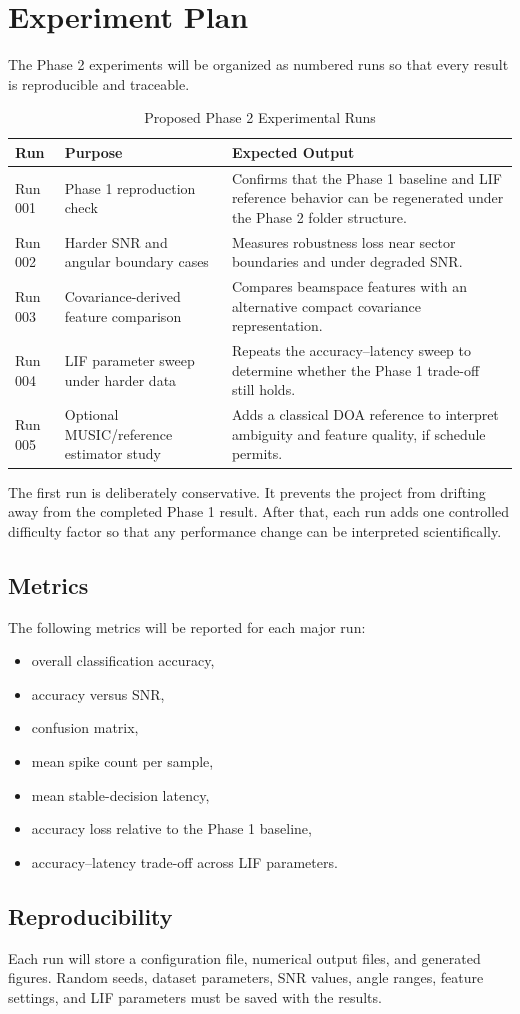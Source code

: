 \section{Experiment Plan}

The Phase 2 experiments will be organized as numbered runs so that every result is reproducible and traceable.

\begin{table}[H]
\centering
\caption{Proposed Phase 2 Experimental Runs}
\begin{tabular}{p{}p{}p{}}
\toprule
\textbf{Run} & \textbf{Purpose} & \textbf{Expected Output} \\
\midrule
Run 001 & Phase 1 reproduction check & Confirms that the Phase 1 baseline and LIF reference behavior can be regenerated under the Phase 2 folder structure. \\
Run 002 & Harder SNR and angular boundary cases & Measures robustness loss near sector boundaries and under degraded SNR. \\
Run 003 & Covariance-derived feature comparison & Compares beamspace features with an alternative compact covariance representation. \\
Run 004 & LIF parameter sweep under harder data & Repeats the accuracy--latency sweep to determine whether the Phase 1 trade-off still holds. \\
Run 005 & Optional MUSIC/reference estimator study & Adds a classical DOA reference to interpret ambiguity and feature quality, if schedule permits. \\
\bottomrule
\end{tabular}
\end{table}

The first run is deliberately conservative. It prevents the project from drifting away from the completed Phase 1 result. After that, each run adds one controlled difficulty factor so that any performance change can be interpreted scientifically.

\subsection{Metrics}

The following metrics will be reported for each major run:

\begin{itemize}
    \item overall classification accuracy,
    \item accuracy versus SNR,
    \item confusion matrix,
    \item mean spike count per sample,
    \item mean stable-decision latency,
    \item accuracy loss relative to the Phase 1 baseline,
    \item accuracy--latency trade-off across LIF parameters.
\end{itemize}

\subsection{Reproducibility}

Each run will store a configuration file, numerical output files, and generated figures. Random seeds, dataset parameters, SNR values, angle ranges, feature settings, and LIF parameters must be saved with the results.
